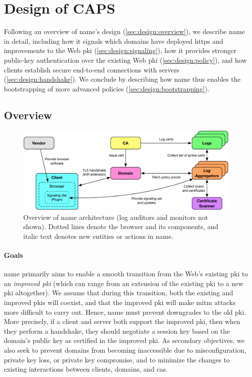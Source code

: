 \section{Design of CAPS}
\label{sec:design}

Following an overview of \ac{name}'s design (\autoref{sec:design:overview}), we
describe \ac{name} in detail, including how it signals which domains have
deployed \ac{https} and improvements to the Web \ac{pki}
(\autoref{sec:design:signaling}), how it provides stronger public-key
authentication over the existing Web \ac{pki} (\autoref{sec:design:policy}), and
how clients establish secure end-to-end connections with servers
(\autoref{sec:design:handshake}). We conclude by describing how \ac{name} thus
enables the bootstrapping of more advanced policies
(\autoref{sec:design:bootstrapping}).

\subsection{Overview}
\label{sec:design:overview}

\begin{figure}
  \centering
  \includegraphics[width=0.8\linewidth]{fig/arch}
  \caption{Overview of \ac{name} architecture (log auditors and monitors not
  shown). Dotted lines denote the browser and its components, and italic text
denotes new entities or actions in \ac{name}.}
  \label{fig:overview}
\end{figure}

\paragraph{Goals}

\ac{name} primarily aims to enable a smooth transition from the Web's existing
\ac{pki} to an \emph{improved \ac{pki}} (which can range from an extension of
the existing \ac{pki} to a new \ac{pki} altogether). We assume that during this
transition, both the existing and improved \acp{pki} will coexist, and that the
improved \ac{pki} will make \ac{mitm} attacks more difficult to carry out.
Hence, \ac{name} must prevent downgrades to the old \ac{pki}. More precisely, if
a client and server both support the improved \ac{pki}, then when they perform a
handshake, they should negotiate a session key based on the domain's public key
as certified in the improved \ac{pki}. As secondary objectives, we also seek to
prevent domains from becoming inaccessible due to misconfiguration, private key
loss, or private key compromise, and to minimize the changes to existing
interactions between clients, domains, and \acp{ca}.

